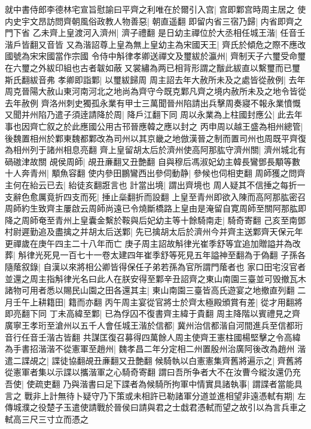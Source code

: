 就中書侍郎李德林宅宣旨慰諭曰平齊之利唯在於爾引入宫|{
	宫即鄴宫時周主居之}
使内史宇文昂訪問齊朝風俗政教人物善惡|{
	朝直遥翻}
即留内省三宿乃歸|{
	内省即齊之門下省}
乙未齊上皇渡河入濟州|{
	濟子禮翻}
是日幼主禪位於大丞相任城王湝|{
	任音壬湝戶皆翻又音皆}
又為湝詔尊上皇為無上皇幼主為宋國天王|{
	齊氏於傾危之際不應改國號為宋宋國當作宗國}
令侍中斛律孝卿送禪文及璽紱於瀛州|{
	齊制天子六璽受命璽在六璽之外紱印組也古者韍如蔽又裳繡為两已相背形謂之黻此紱直以繫璽而已璽斯氏翻紱音弗}
孝卿即詣鄴|{
	以璽紱歸周}
周主詔去年大赦所未及之處皆從赦例|{
	去年周克晉陽大赦山東河南河北之地尚為齊守今既克鄴凡齊之境内赦所未及之地令皆從去年赦例}
齊洛州刺史獨孤永業有甲士三萬聞晉州陷請出兵擊周奏寢不報永業憤慨又聞并州陷乃遣子須逹請降於周|{
	降戶江翻下同}
周以永業為上柱國封應公|{
	此去年事也因齊亡叙之於此應國公用古邗晉應韓之應以封之}
丙申周以越王盛為相州總管|{
	後魏置相州於鄴東魏都鄴改為司州以其京畿之地倣漢晉之制而置司州也周既平齊復為相州列于諸州相息亮翻}
齊上皇留胡太后於濟州使高阿那肱守濟州關|{
	濟州城北有碢磝津故關}
覘侯周師|{
	覘丑亷翻又丑艶翻}
自與穆后馮淑妃幼主韓長鸞鄧長顒等數十人奔青州|{
	顒魚容翻}
使内參田鵬鸞西出參伺動静|{
	參候也伺相吏翻}
周師獲之問齊主何在紿云已去|{
	紿徒亥翻誑言也}
計當出境|{
	謂出齊境也}
周人疑其不信捶之每折一支辭色愈厲竟折四支而死|{
	捶止橤翻折而設翻}
上皇至青州即欲入陳而高阿那肱密召周師約生致齊主屢啟云周師尚遠已令燒斷橋路上皇由是淹留自寛周師至關阿那肱即降之周師奄至青州上皇囊金繫於鞍與后妃幼主等十餘騎南走|{
	騎奇寄翻}
己亥至南鄧村尉遲勤追及盡擒之并胡太后送鄴|{
	先已擒胡太后於濟州今并齊主送鄴齊天保元年更禪歲在庚午四主二十八年而亡}
庚子周主詔故斛律光崔季舒等宜追加贈謚并為改葬|{
	斛律光死見一百七十一卷太建四年崔季舒等死見五年謚神至翻為于偽翻}
子孫各隨䕃叙錄|{
	自漢以來將相公卿皆得保任子弟若孫為官所謂門䕃者也}
家口田宅沒官者並還之周主指斛律光名曰此人在朕安得至鄴辛丑詔齊之東山南園三臺並可毁撤瓦木諸物可用者悉以賜民山園之田各還其主|{
	東山南園三臺皆高氏遊宴之地撤直列翻}
二月壬午上耕籍田|{
	籍而亦翻}
丙午周主宴從官將士於齊太極殿頒賞有差|{
	從才用翻將即亮翻下同}
丁未高緯至鄴|{
	已為俘囚不復書齊主緯于貴翻}
周主降階以賓禮見之齊廣寧王孝珩至滄州以五千人會任城王湝於信都|{
	冀州治信都湝自河間進兵至信都珩音行任音壬湝古皆翻}
共謀匡復召募得四萬餘人周主使齊王憲柱國楊堅擊之令高緯為手書招湝湝不從憲軍至趙州|{
	魏孝昌二年分定相二州置殷州治廣阿後改為趙州}
湝遣二諜覘之|{
	諜徒協翻覘丑亷翻又丑艶翻}
候騎執以白憲憲集齊舊將遍示之|{
	齊舊將從憲軍者集以示諜以攜湝軍之心騎奇寄翻}
謂曰吾所争者大不在汝曹今縱汝還仍充吾使|{
	使疏吏翻}
乃與湝書曰足下諜者為候騎所拘軍中情實具諸執事|{
	謂諜者當能具言之}
戰非上計無待卜疑守乃下策或未相許已勒諸軍分道並進相望非遠憑軾有期|{
	左傳城濮之役楚子玉遣使請戰於晉侯曰請與君之士戱君憑軾而望之故引以為言兵車之軾高三尺三寸立而憑之}

